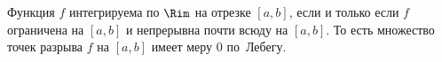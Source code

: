 
 Функция $f$ интегрируема по $\Rim$ на отрезке $[a,b]$, если и только если $f$ ограничена на $[a,b]$ и непрерывна почти всюду на $[a,b]$.
 То есть множество точек разрыва $f$ на $[a,b]$ имеет меру $0$ по~Лебегу.
 